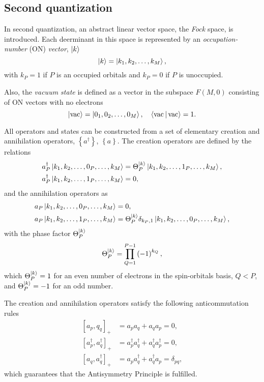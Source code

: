 \subsection{Second quantization} %
\label{sec:second-quantization}

In second quantization, an abstract linear vector space, the \textit{Fock} space,
is introduced.
Each deerminant in this space is represented by an \textit{occupation-number}
(ON) \textit{vector}, $ \Ket{k}$ 
\begin{equation}
    \Ket{k} =
    \Ket{k_1,k_2,\ldots,k_M}
    ,
\end{equation}
with $k_P = 1$ if $P$ is an occupied orbitals and $k_P = 0$ if $P$ is unoccupied.

Also, the \textit{vacuum state} is defined as a vector in the subspace
$F\left( M,0 \right)$ consisting of ON vectors with no electrons 
\begin{equation}
    \Ket{\text{vac}} =
    \Ket{0_1, 0_2, \ldots, 0_M}
    , \quad
    \Braket{\text{vac} | \text{vac}} = 1
    .
\end{equation}

All operators and states can be constructed from a set of elementary
creation and annihilation operators, $\left\{ a^{\dagger} \right\}$, 
$\left\{ a \right\}$.
The creation operators are defined by the relations
\begin{align}
    a_P^{\dagger} \Ket{k_1,k_2,\ldots,0_P,\ldots,k_M} &=
    \Theta_P^{\Ket{k}}
    \Ket{k_1, k_2, \ldots, 1_P, \ldots, k_M}
    , \\
    a_P^{\dagger} \Ket{k_1, k_2, \ldots, 1_P, \ldots, k_M} &= 0
    ,
\end{align}
and the annihilation operators as
\begin{align}
    a_P \Ket{k_1,k_2,\ldots,0_P,\ldots,k_M} &= 0
    , \\
    a_P \Ket{k_1, k_2, \ldots, 1_P, \ldots, k_M} &=
    \Theta_P^{\Ket{k}} \delta_{k_P,1}
    \Ket{k_1, k_2, \ldots, 0_P, \ldots, k_M}
    ,
\end{align}
with the phase factor $\Theta_P^{\Ket{k}}$  
\begin{equation}
    \Theta_P^{\Ket{k}} =
    \prod_{Q=1}^{P-1} \left( -1 \right)^{k_Q}
    ,
\end{equation}
which $\Theta_P^{\Ket{k}}=1$ for an even number of electrons in the spin-orbitals
basis, $Q < P$, and  $\Theta_P^{\Ket{k}}=-1$ for an odd number.

The creation and annihilation operators satisfy the following anticommutation
rules
\begin{align}
    \left[ a_p,q_q \right]_{+}
    &=
    a_p a_q + a_q a_p = 0
    , \\
    \left[ a_p^{\dagger}, a_q^{\dagger} \right]_{+}
    &= a_p^{\dagger} a_q^{\dagger} + a_q^{\dagger} a_p^{\dagger} = 0
    , \\
    \left[ a_q, a_q^{\dagger} \right]_{+}
    &=
    a_p a_q^{\dagger} + a_q^{\dagger} a_p = \delta_{pq},
\end{align}
which guarantees that the Antisymmetry Principle is fulfilled.

